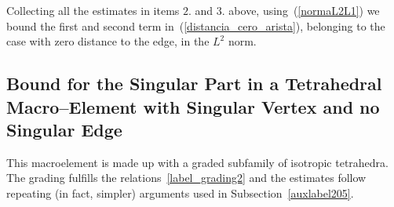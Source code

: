 Collecting all the estimates in items $2.$ and $3.$ above, using~(\ref{normaL2L1})
we bound the first and second term in~(\ref{distancia_cero_arista}), 
belonging to the case with zero distance
to the edge, in the $L^2$ norm.

\subsection{Bound for the Singular Part in a Tetrahedral Macro--Element
with Singular Vertex and no Singular Edge}
This macroelement is made up with a graded subfamily of isotropic tetrahedra.
The grading fulfills the relations~\eqref{label_grading2} and the estimates
follow repeating (in fact, simpler) arguments used in Subsection~\ref{auxlabel205}.  
